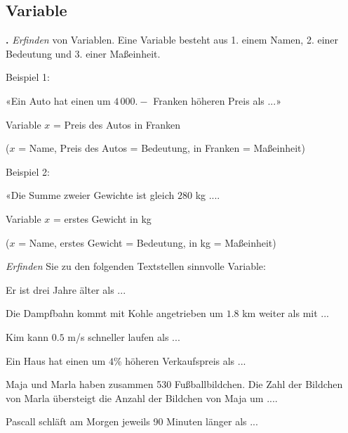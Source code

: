\newpage



\subsection{Variable}
\textbf{\bbwAufgabenNummer{}.}
\textit{Erfinden} von Variablen. Eine Variable besteht aus 1. einem
Namen, 2. einer Bedeutung und 3. einer Maßeinheit.

Beispiel 1:

«Ein Auto hat einen um $4\,000.-$ Franken höheren Preis als ...»

Variable $x$ = Preis des Autos in Franken

($x$ = Name, Preis des Autos = Bedeutung, in Franken = Maßeinheit)

Beispiel 2:

«Die Summe zweier Gewichte ist gleich $280$ kg ....

Variable $x$ = erstes Gewicht in kg

($x$ = Name, erstes Gewicht = Bedeutung, in kg = Maßeinheit)


\textit{Erfinden} Sie zu den folgenden Textstellen sinnvolle Variable:

\begin{bbwAufgabenBlock}


\item Er ist drei Jahre älter als ...


\item Die Dampfbahn kommt mit Kohle angetrieben um $1.8$ km weiter als
mit ...


\item Kim kann $0.5$ m/s schneller laufen als ...


\item Ein Haus hat einen um $4$\% höheren Verkaufspreis als ...


\noTRAINER{\newpage}

\item Maja und Marla haben zusammen 530 Fußballbildchen. Die Zahl der
Bildchen von Marla übersteigt die Anzahl der Bildchen von Maja um ....


\item Pascall schläft am Morgen jeweils 90 Minuten länger als ...


\end{bbwAufgabenBlock}


